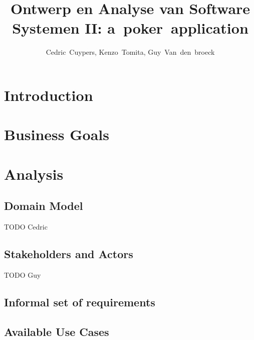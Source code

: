 \documentclass[a4paper,11pt]{report}
\author{Cedric~Cuypers, Kenzo~Tomita, Guy~Van~den~broeck}
\title{Ontwerp en Analyse van Software Systemen II: a~poker~application}
\begin{document}
 
\maketitle 
\tableofcontents 
\chapter{Introduction}
\chapter{Business Goals}
\chapter{Analysis}
\section{Domain Model}
TODO Cedric
\section{Stakeholders and Actors}
TODO Guy
\section{Informal set of requirements}
\section{Available Use Cases}
\end{document}
